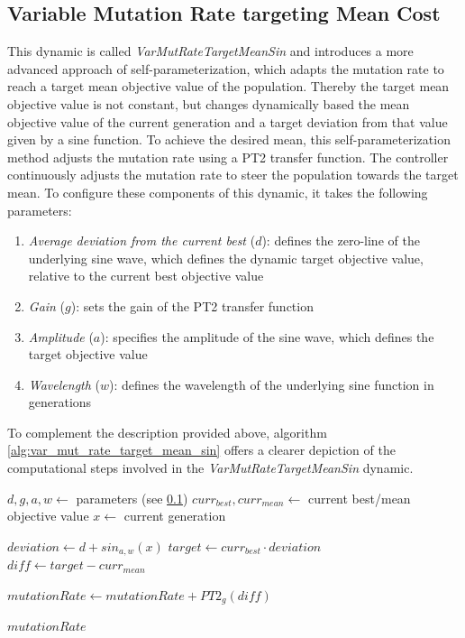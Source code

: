 \documentclass[english,examples]{isasthesis}
\begin{document}
\subsection{Variable Mutation Rate targeting Mean Cost}
\label{VarMutRateTargetMeanSin}
This dynamic is called \textit{VarMutRateTargetMeanSin} and introduces a more
advanced approach of self-parameterization, which adapts the mutation rate
to reach a target mean objective value of the population. Thereby the target
mean objective value is not constant, but changes dynamically based the mean
objective value of the current generation and a target deviation from that
value given by a sine function.
To achieve the desired mean, this self-parameterization method adjusts the
mutation rate using a PT2 transfer function. The controller continuously
adjusts the mutation rate to steer the population towards the target mean.
To configure these components of this dynamic, it takes the following
parameters:
\begin{enumerate}
    \item   \textit{Average deviation from the current best} ($d$): defines the
            zero-line of the underlying sine wave, which defines the dynamic
            target objective value, relative to the current best objective
            value
    \item   \textit{Gain} ($g$): sets the gain of the PT2 transfer function
    \item   \textit{Amplitude} ($a$): specifies the amplitude of the sine wave,
            which defines the target objective value
    \item   \textit{Wavelength} ($w$): defines the wavelength of the underlying
            sine function in generations
\end{enumerate}

To complement the description provided above, algorithm
\ref{alg:var_mut_rate_target_mean_sin} offers a clearer depiction of the
computational steps involved in the \textit{VarMutRateTargetMeanSin} dynamic.

\begin{algorithm}
    \caption{
        Mutation Rate Adaption targeting dynamic Mean Objective Value
    }
    \label{alg:var_mut_rate_target_mean_sin}

    \begin{algorithmic}
        \REQUIRE $d,g,a,w \gets$ parameters (see \ref{VarMutRateTargetMeanSin})
        \REQUIRE $curr_{best}, curr_{mean} \gets$ current best/mean objective
            value
        \REQUIRE $x \gets $ current generation

        \STATE $deviation \gets d + sin_{a,w}(x)$
        \STATE $target \gets curr_{best} \cdot deviation$
        \STATE $diff \gets target - curr_{mean}$

        \STATE $mutationRate \gets mutationRate + PT2_g(diff)$

        \RETURN $mutationRate$

    \end{algorithmic}
\end{algorithm}
\end{document}
